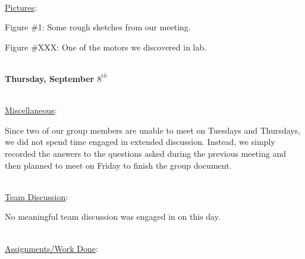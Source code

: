 \documentclass[12pt]{extarticle}
\newenvironment{myindentpar}[1]%
 {\begin{list}{}%
         {\setlength{\leftmargin}{#1}}%
         \item[]%
 }
 {\end{list}}
\begin{document}
\ \\
\underline{Pictures}:

\begin{center}
    Figure \#1: Some rough sketches from our meeting. 
\end{center}
\begin{center}
\end{center}

\begin{center}
    Figure \#XXX: One of the motors we discovered in lab.
\end{center}
\begin{center}
\end{center}



\ \\
\textbf{Thursday, September $8^{th}$}

\ \\
\underline{Miscellaneous}:

\begin{myindentpar}{6.5mm}

    \noindent
    Since two of our group members are unable to meet on Tuesdays and Thursdays, we did not spend time engaged in extended discussion.  Instead, we simply recorded the answers to the questions asked during the previous meeting and then planned to meet on Friday to finish the group document.  

\end{myindentpar}

\ \\
\underline{Team Discussion}:

\begin{myindentpar}{6.5mm}

    \noindent
    No meaningful team discussion was engaged in on this day.  

\end{myindentpar}

\ \\
\underline{Assignments/Work Done}:
\end{document}

